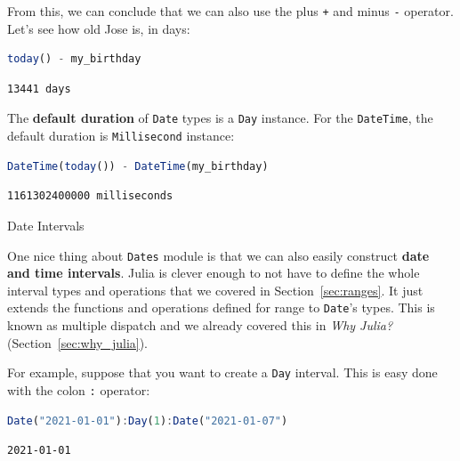 \documentclass[
  notoc %
]{tufte-book}
\makeatletter
\newcommand{\passthrough}[1]{#1}
\renewcommand\subsubsection{%
\@startsection{subsubsection}{3}{\z@ }{-3.25ex\@plus -1ex \@minus -.2ex}{1.5ex \@plus .2ex}{\normalfont \normalsize \bfseries }
}
\makeatother
\begin{document}
From this, we can conclude that we can also use the plus
\passthrough{\lstinline!+!} and minus \passthrough{\lstinline!-!}
operator. Let's see how old Jose is, in days:

\begin{lstlisting}[language=Julia]
today() - my_birthday
\end{lstlisting}

\begin{lstlisting}[language=Output]
13441 days
\end{lstlisting}

The \textbf{default duration} of \passthrough{\lstinline!Date!} types is
a \passthrough{\lstinline!Day!} instance. For the
\passthrough{\lstinline!DateTime!}, the default duration is
\passthrough{\lstinline!Millisecond!} instance:

\begin{lstlisting}[language=Julia]
DateTime(today()) - DateTime(my_birthday)
\end{lstlisting}

\begin{lstlisting}[language=Output]
1161302400000 milliseconds
\end{lstlisting}

\hypertarget{sec:dates_intervals}{%
\subsubsection{Date Intervals}\label{sec:dates_intervals}}

One nice thing about \passthrough{\lstinline!Dates!} module is that we
can also easily construct \textbf{date and time intervals}. Julia is
clever enough to not have to define the whole interval types and
operations that we covered in Section~\ref{sec:ranges}. It just extends
the functions and operations defined for range to
\passthrough{\lstinline!Date!}'s types. This is known as multiple
dispatch and we already covered this in \emph{Why Julia?}
(Section~\ref{sec:why_julia}).

For example, suppose that you want to create a
\passthrough{\lstinline!Day!} interval. This is easy done with the colon
\passthrough{\lstinline!:!} operator:

\begin{lstlisting}[language=Julia]
Date("2021-01-01"):Day(1):Date("2021-01-07")
\end{lstlisting}

\begin{lstlisting}[language=Output]
2021-01-01
\end{lstlisting}
\end{document}
